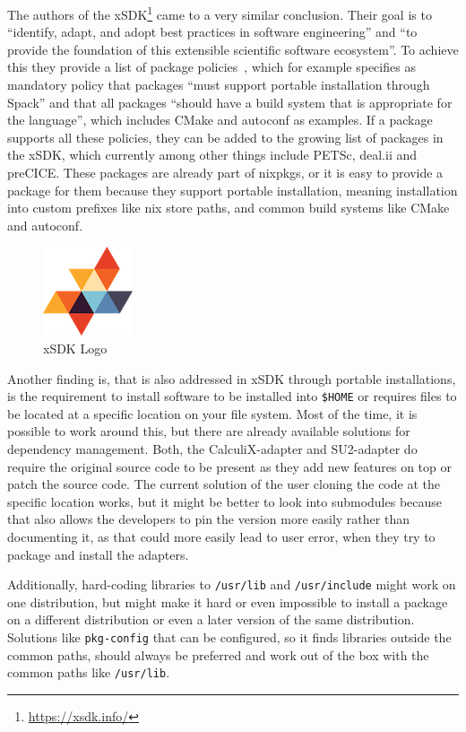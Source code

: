 \documentclass[conference,final,a4paper]{IEEEtran}
\begin{document}
The authors of the xSDK\footnote{\url{https://xsdk.info/}} came to a very similar conclusion.
Their goal is to ``identify, adapt, and adopt best practices in software engineering''\cite{xsdk-website} and ``to provide the foundation of this extensible scientific software ecosystem''\cite{xsdk-website}.
To achieve this they provide a list of package policies~\cite{xSDK2023}, which for example specifies as mandatory policy that packages ``must support portable installation through Spack''\cite{xSDK2023} and that all packages ``should have a build system that is appropriate for the language''\cite{xSDK2023}, which includes CMake and autoconf as examples.
If a package supports all these policies, they can be added to the growing list of packages in the xSDK, which currently among other things include PETSc, deal.ii and preCICE.
These packages are already part of nixpkgs, or it is easy to provide a package for them because they support portable installation, meaning installation into custom prefixes like nix store paths, and common build systems like CMake and autoconf.
\begin{figure}[htbp]
  \centerline{\includegraphics{figures/xsdk.png}}
  \caption{xSDK Logo}
  \label{fig}
\end{figure}

Another finding is, that is also addressed in xSDK through portable installations, is the requirement to install software to be installed into \texttt{\$HOME} or requires files to be located at a specific location on your file system.
Most of the time, it is possible to work around this, but there are already available solutions for dependency management.
Both, the CalculiX-adapter and SU2-adapter do require the original source code to be present as they add new features on top or patch the source code.
The current solution of the user cloning the code at the specific location works, but it might be better to look into submodules because that also allows the developers to pin the version more easily rather than documenting it, as that could more easily lead to user error, when they try to package and install the adapters.

Additionally, hard-coding libraries to \texttt{/usr/lib} and \texttt{/usr/include} might work on one distribution, but might make it hard or even impossible to install a package on a different distribution or even a later version of the same distribution.
Solutions like \texttt{pkg-config} that can be configured, so it finds libraries outside the common paths, should always be preferred and work out of the box with the common paths like \texttt{/usr/lib}.
\end{document}
